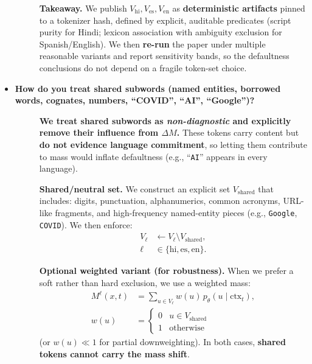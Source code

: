\begin{itemize}[leftmargin=1.5em]
\begin{description}
\vspace{6pt}
\textbf{Takeaway.} We publish $V_{\mathrm{hi}},V_{\mathrm{es}},V_{\mathrm{en}}$ as \textbf{deterministic artifacts} pinned to a tokenizer hash, defined by explicit, auditable predicates (script purity for Hindi; lexicon association with ambiguity exclusion for Spanish/English). We then \textbf{re-run} the paper under multiple reasonable variants and report sensitivity bands, so the defaultness conclusions do not depend on a fragile token-set choice.
\end{description}








\item[\ding{93}] \textbf{How do you treat shared subwords (named entities, borrowed words, cognates, numbers, “COVID”, “AI”, “Google”)?}
\begin{description}
\item[] \textbf{We treat shared subwords as \emph{non-diagnostic} and explicitly \textbf{remove their influence} from $\Delta M$.}
These tokens carry content but \textbf{do not evidence language commitment}, so letting them contribute to mass would inflate defaultness (e.g., “\texttt{AI}” appears in every language).

\vspace{2pt}
\textbf{Shared/neutral set.} We construct an explicit set $V_{\mathrm{shared}}$ that includes: digits, punctuation, alphanumerics, common acronyms, URL-like fragments, and high-frequency named-entity pieces (e.g., \texttt{Google}, \texttt{COVID}). We then enforce:
\[
\begin{aligned}
V_{\ell} &\leftarrow V_{\ell}\setminus V_{\mathrm{shared}},\\
\ell &\in\{\mathrm{hi},\mathrm{es},\mathrm{en}\}.
\end{aligned}
\]

\vspace{2pt}
\textbf{Optional weighted variant (for robustness).} When we prefer a soft rather than hard exclusion, we use a weighted mass:
\[
\begin{aligned}
M^{\ell}(x,t) &= \sum_{u\in V_{\ell}} w(u)\,p_\theta(u\mid \mathrm{ctx}_t),\\
w(u) &=
\begin{cases}
0 & u\in V_{\mathrm{shared}}\\
1 & \text{otherwise}
\end{cases}
\end{aligned}
\]
(or $w(u)\ll 1$ for partial downweighting). In both cases, \textbf{shared tokens cannot carry the mass shift}.


\end{description}
\end{itemize}

